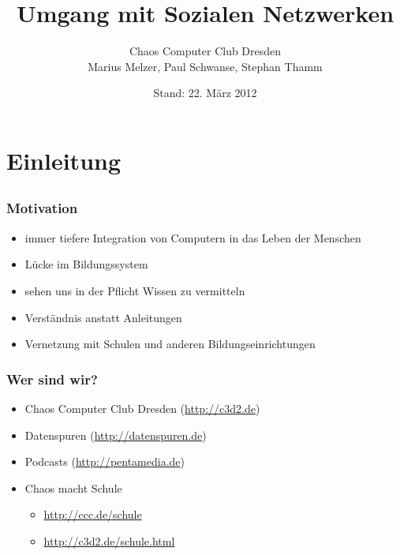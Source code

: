 \documentclass[14pt,handout]{beamer}
\title{Umgang mit Sozialen Netzwerken}
\author{Chaos Computer Club Dresden\\Marius Melzer, Paul Schwanse, Stephan Thamm}
\date{Stand: 22. März 2012}
\begin{document}
\maketitle

\frame{\tableofcontents[hideallsubsections]}

\section{Einleitung}
\subsection{}

\begin{frame}
    \frametitle{Motivation}
    \begin{itemize}
        \item<2-> immer tiefere Integration von Computern in das Leben der Menschen
        \item<3-> Lücke im Bildungssystem
        \item<4-> sehen uns in der Pflicht Wissen zu vermitteln
        \item<5-> Verständnis anstatt Anleitungen
        \item<6-> Vernetzung mit Schulen und anderen Bildungseinrichtungen
    \end{itemize}
\end{frame}

\begin{frame}
    \frametitle{Wer sind wir?}
    \begin{itemize}
        \item<2-> Chaos Computer Club Dresden (\url{http://c3d2.de})
            \note{}
        \item<3-> Datenspuren (\url{http://datenspuren.de})
        \item<4-> Podcasts (\url{http://pentamedia.de})
        \item<5-> Chaos macht Schule
            \begin{itemize}
                \item \url{http://ccc.de/schule}
                \item \url{http://c3d2.de/schule.html}
            \end{itemize}
    \end{itemize}
\end{frame}
\end{document}

